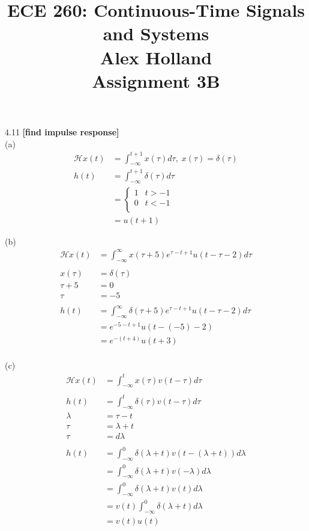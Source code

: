\documentclass{article}
\title{%
   ECE 260: Continuous-Time Signals and Systems\\
    \Large Alex Holland\\
    Assignment 3B\\
    }
\date{}
\begin{document}
\maketitle


4.11 {\bf [find impulse response]}\\
(a)\\
\begin{equation*}
\begin{split}
    \mathcal{H}x(t) &= \int_{-\infty}^{t + 1} x(\tau)d\tau, \; x(\tau) = \delta(\tau)\\
    h(t) &= \int_{-\infty}^{t + 1} \delta(\tau)d\tau\\
    &= \begin{cases}
        1 & t > -1\\
        0 & t < -1\\
    \end{cases}\\
    &= u(t + 1)
\end{split}
\end{equation*}

(b)\\
\begin{equation*}
\begin{split}
    \mathcal{H}x(t) &= \int_{-\infty}^{\infty} x(\tau + 5)e^{\tau - t + 1}u(t - \tau - 2)d\tau\\\\
    x(\tau) &= \delta(\tau)\\
    \tau + 5 &= 0\\
    \tau &= -5\\\\
    h(t) &= \int_{-\infty}^{\infty} \delta(\tau + 5)e^{\tau - t + 1}u(t - \tau - 2)d\tau\\
    &= e^{-5 - t + 1}u(t - (-5) - 2)\\
    &= e^{-(t + 4)}u(t + 3)\\
\end{split}
\end{equation*}

(c)\\
\begin{equation*}
\begin{split}
    \mathcal{H}x(t) &= \int_{-\infty}^{t} x(\tau)v(t - \tau)d\tau\\\\
    h(t) &= \int_{-\infty}^{t} \delta(\tau)v(t - \tau)d\tau\\
    \lambda &= \tau - t\\
    \tau &= \lambda + t\\
    \tau &= d\lambda\\\\
    h(t) &= \int_{-\infty}^{0} \delta(\lambda + t)v(t - (\lambda + t))d\lambda\\
    &= \int_{-\infty}^{0} \delta(\lambda + t)v(-\lambda)d\lambda\\
    &= \int_{-\infty}^{0} \delta(\lambda + t)v(t)d\lambda\\
    &= v(t) \int_{-\infty}^{0} \delta(\lambda + t)d\lambda\\
    &= v(t)u(t)\\
\end{split}
\end{equation*}
\end{document}
